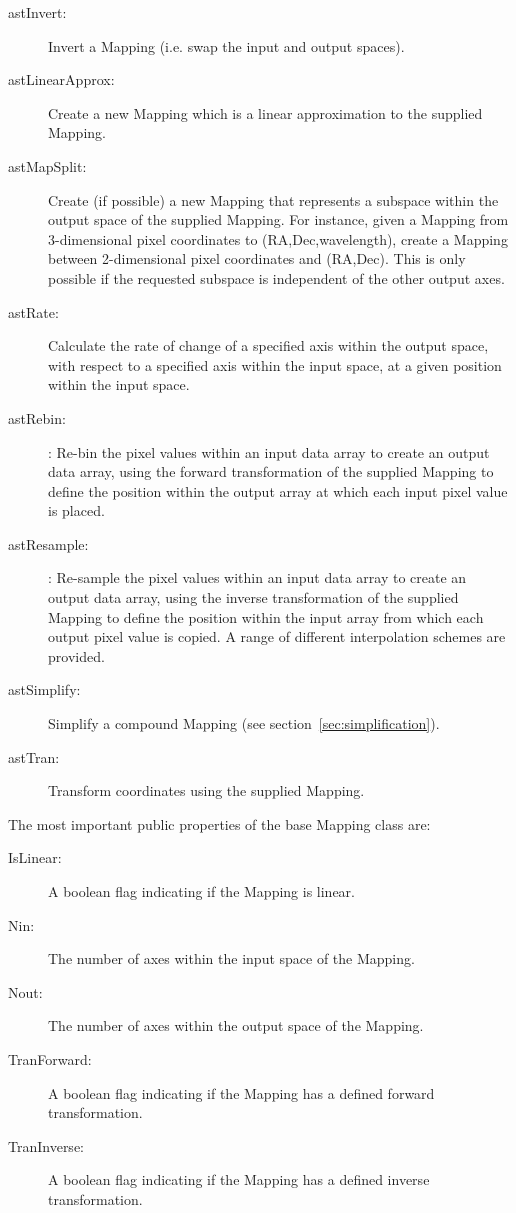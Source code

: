 \documentclass[final,authoryear,5p,times,twocolumn]{elsarticle}
\begin{document}
\begin{description}

\item[astInvert:] Invert a Mapping (i.e. swap the input and output spaces).

\item[astLinearApprox:] Create a new Mapping which is a linear approximation
to the supplied Mapping.

\item[astMapSplit:] Create (if possible) a new Mapping that represents a
subspace within the output space of the supplied Mapping. For instance,
given a Mapping from 3-dimensional pixel coordinates to
(RA,Dec,wavelength), create a Mapping between 2-dimensional pixel
coordinates and (RA,Dec). This is only possible if the requested subspace
is independent of the other output axes.

\item[astRate:] Calculate the rate of change of a specified axis within the
output space, with respect to a specified axis within the input space, at
a given position within the input space.

\item[astRebin:]: Re-bin the pixel values within an input data array to create
an output data array, using the forward transformation of the supplied Mapping
to define the position within the output array at which each input pixel value
is placed.

\item[astResample:]: Re-sample the pixel values within an input data array to
create an output data array, using the inverse transformation of the supplied
Mapping to define the position within the input array from which each
output pixel value is copied. A range of different interpolation schemes
are provided.

\item[astSimplify:] Simplify a compound Mapping (see
section~\ref{sec:simplification}).

\item[astTran:] Transform coordinates using the supplied Mapping.

\end{description}

The most important public properties of the base Mapping class are:
\begin{description}

\item[IsLinear:] A boolean flag indicating if the Mapping is linear.
\item[Nin:] The number of axes within the input space of the Mapping.
\item[Nout:] The number of axes within the output space of the Mapping.
\item[TranForward:] A boolean flag indicating if the Mapping has a defined
forward transformation.
\item[TranInverse:] A boolean flag indicating if the Mapping has a defined
inverse transformation.
\end{description}
\end{document}
